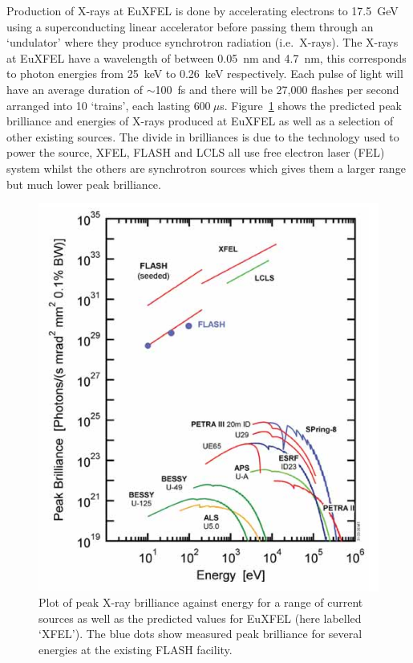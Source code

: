 Production of X-rays at EuXFEL is done by accelerating electrons to 17.5~GeV using a superconducting linear accelerator before passing them through an `undulator' where they produce synchrotron radiation (i.e.\ X-rays). The X-rays at EuXFEL have a wavelength of between 0.05~nm and 4.7~nm, this corresponds to photon energies from 25~keV to 0.26~keV respectively. Each pulse of light will have an average duration of \(\sim\)100~fs and there will be 27,000 flashes per second arranged into 10 `trains', each lasting \(600~\mu\)s. Figure~\ref{fig:xfel-brightness} shows the predicted peak brilliance and energies of X-rays produced at EuXFEL as well as a selection of other existing sources. The divide in brilliances is due to the technology used to power the source, XFEL, FLASH and LCLS all use free electron laser (FEL) system whilst the others are synchrotron sources which gives them a larger range but much lower peak brilliance. 

\begin{figure}[h]
  \centering
    \includegraphics[width=.9\textwidth]{images/Other/XFEL-comparitive_energy-brightness.png}
  \caption{Plot of peak X-ray brilliance against energy for a range of current sources as well as the predicted values for EuXFEL (here labelled `XFEL'). The blue dots show measured peak brilliance for several energies at the existing FLASH facility.}
  \label{fig:xfel-brightness}
\end{figure}

